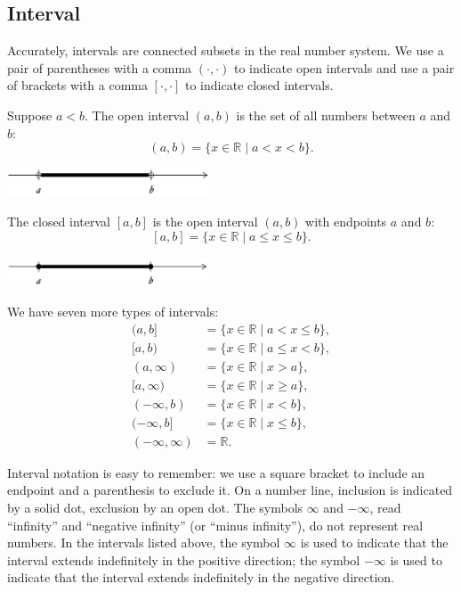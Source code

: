 \documentclass[11pt]{book}
\theoremstyle{break}
\theoremstyle{no_label}
\newcommand{\bbR}{\mathbb{R}}
\numberwithin{equation}{section}
\begin{document}
\subsection*{Interval}

Accurately, intervals are connected subsets in the real number system. We use a pair of parentheses with a comma $(\cdot, \cdot)$ to indicate open intervals and use a pair of brackets with a comma $[\cdot, \cdot]$ to indicate closed intervals.

Suppose $a<b$. The open interval $(a, b)$ is the set of all numbers between $a$ and $b$: $$(a, b)=\{x\in\bbR\mid a<x<b\}.$$
\begin{center}
    \includegraphics[width=0.45\textwidth]{interval_oo.JPG}
\end{center}
The closed interval $[a, b]$ is the open interval $(a, b)$ with endpoints $a$ and $b$: $$[a, b]=\{x\in\bbR\mid a\leq x\leq b\}.$$
\begin{center}
    \includegraphics[width=0.45\textwidth]{interval_cc.JPG}
\end{center} We have seven more types of intervals: \begin{align*}
    (a, b]&=\{x\in\bbR\mid a<x\leq b\},\\
    [a, b)&=\{x\in\bbR\mid a\leq x<b\},\\
    (a, \infty)&=\{x\in\bbR\mid x>a\},\\
    [a, \infty)&=\{x\in\bbR\mid x\geq a\},\\
    (-\infty, b)&=\{x\in\bbR\mid x<b\},\\
    (-\infty, b]&=\{x\in\bbR\mid x\leq b\},\\
    (-\infty, \infty)&=\bbR.
\end{align*}

Interval notation is easy to remember: we use a square bracket to include an endpoint and a parenthesis to exclude it. On a number line, inclusion is indicated by a solid dot, exclusion by an open dot. The symbols $\infty$ and $-\infty$, read “infinity” and “negative infinity” (or “minus infinity”), do not represent real numbers. In the intervals listed above, the symbol $\infty$ is used to indicate that the interval extends indefinitely in the positive direction; the symbol $-\infty$ is used to indicate that the interval extends indefinitely in the negative direction.
\end{document}
